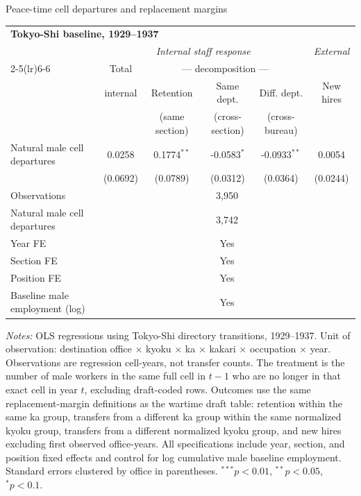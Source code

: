 \begin{frame}[t]{Peace-time cell departures and replacement margins}
    \tiny
    \centering
    \begin{threeparttable}
    \begin{tabular}{lcccc|c}
        \toprule
        \multicolumn{6}{l}{\textbf{Tokyo-Shi baseline, 1929--1937}} \\[2pt]
        & \multicolumn{4}{c|}{\textit{Internal staff response}} & \textit{External} \\ 
        \cmidrule(lr){2-5}\cmidrule(lr){6-6}
         & Total & \multicolumn{3}{c|}{--- decomposition ---} & \\ 
         & internal & Retention & Same dept. & Diff. dept. & New hires \\ 
         &  & (same section) & (cross-section) & (cross-bureau) & \\ 
        \midrule
        Natural male cell departures & 0.0258 & 0.1774$^{**}$ & -0.0583$^{*}$ & -0.0933$^{**}$ & 0.0054 \\
         & (0.0692) & (0.0789) & (0.0312) & (0.0364) & (0.0244) \\
        \midrule
        Observations & \multicolumn{5}{c}{3,950} \\
        Natural male cell departures & \multicolumn{5}{c}{3,742} \\
        Year FE & \multicolumn{5}{c}{Yes} \\ 
        Section FE & \multicolumn{5}{c}{Yes} \\ 
        Position FE & \multicolumn{5}{c}{Yes} \\ 
        Baseline male employment (log) & \multicolumn{5}{c}{Yes} \\ 
        \bottomrule
    \end{tabular}
    \begin{tablenotes}[flushleft]
        \tiny
        \item \textit{Notes:} OLS regressions using Tokyo-Shi directory transitions, 1929--1937. Unit of observation: destination office $\times$ kyoku $\times$ ka $\times$ kakari $\times$ occupation $\times$ year. Observations are regression cell-years, not transfer counts. The treatment is the number of male workers in the same full cell in $t-1$ who are no longer in that exact cell in year $t$, excluding draft-coded rows. Outcomes use the same replacement-margin definitions as the wartime draft table: retention within the same ka group, transfers from a different ka group within the same normalized kyoku group, transfers from a different normalized kyoku group, and new hires excluding first observed office-years. All specifications include year, section, and position fixed effects and control for log cumulative male baseline employment. Standard errors clustered by office in parentheses. $^{***}p<0.01$, $^{**}p<0.05$, $^{*}p<0.1$.
    \end{tablenotes}
    \end{threeparttable}
\end{frame}
